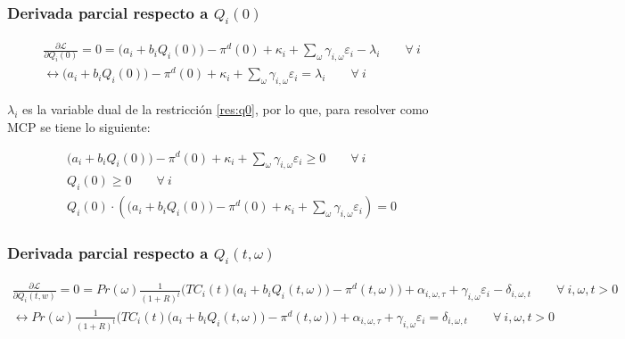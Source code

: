 \subsubsection{Derivada parcial respecto a $Q_i(0)$}
\begin{footnotesize}
\begin{align}
    \frac{\partial \mathcal{L} }{\partial Q_i(0)}= 0 =  \big(a_{i}+b_i Q_{i}(0)\big)-\pi^d(0) + \kappa_i  + \sum_{\omega} \gamma_{i,\omega}\varepsilon_i-\lambda_i \qquad \forall \  i  \\
     \leftrightarrow \big(a_{i}+b_i Q_{i}(0)\big)-\pi^d(0) + \kappa_i  + \sum_{\omega} \gamma_{i,\omega}\varepsilon_i = \lambda_i \qquad \forall \  i
\end{align}

\end{footnotesize}

$\lambda_i$ es la variable dual de la restricción \ref{res:q0}, por lo que, para resolver como MCP se tiene lo siguiente:
\begin{footnotesize}
\begin{align}
    \big(a_{i}+b_i Q_{i}(0)\big)-\pi^d(0) + \kappa_i  + \sum_{\omega} \gamma_{i,\omega}\varepsilon_i \geq 0 \qquad \forall \  i  \\
    Q_i(0) \geq 0 \qquad \forall \  i  \\
    Q_i(0)\cdot ( \big(a_{i}+b_i Q_{i}(0)\big)-\pi^d(0) + \kappa_i  + \sum_{\omega} \gamma_{i,\omega}\varepsilon_i)=0 
\end{align}

\end{footnotesize}



\subsubsection{Derivada parcial respecto a $Q_i(t,\omega)$}
\begin{footnotesize}
\begin{align}
   \frac{\partial \mathcal{L} }{\partial Q_i(t,w)}= 
   0= Pr(\omega)  \frac{1}{(1+R)^t} \bigg( TC_i(t) \big(a_{i}+b_i Q_i(t,\omega)\big ) -\pi^d(t,\omega) \bigg) + \alpha_{i,\omega,\tau} + \gamma_{i,\omega} \varepsilon_{i} -\delta_{i,\omega,t} \qquad  \forall \ i, \omega, t > 0\\
   \leftrightarrow Pr(\omega)  \frac{1}{(1+R)^t} \bigg( TC_i(t) \big(a_{i}+b_i Q_i(t,\omega)\big ) -\pi^d(t,\omega) \bigg) + \alpha_{i,\omega,\tau} + \gamma_{i,\omega} \varepsilon_{i}= \delta_{i,\omega,t} \qquad \forall \ i, \omega, t > 0
\end{align}
\end{footnotesize}

